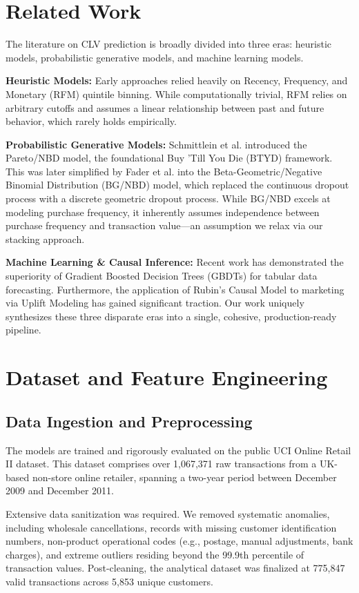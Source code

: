 \documentclass[10pt,conference]{IEEEtran}
\begin{document}
\section{Related Work}
The literature on CLV prediction is broadly divided into three eras: heuristic models, probabilistic generative models, and machine learning models.

\textbf{Heuristic Models:} Early approaches relied heavily on Recency, Frequency, and Monetary (RFM) quintile binning. While computationally trivial, RFM relies on arbitrary cutoffs and assumes a linear relationship between past and future behavior, which rarely holds empirically.

\textbf{Probabilistic Generative Models:} Schmittlein et al. introduced the Pareto/NBD model, the foundational Buy 'Till You Die (BTYD) framework. This was later simplified by Fader et al. \cite{btyd} into the Beta-Geometric/Negative Binomial Distribution (BG/NBD) model, which replaced the continuous dropout process with a discrete geometric dropout process. While BG/NBD excels at modeling purchase frequency, it inherently assumes independence between purchase frequency and transaction value—an assumption we relax via our stacking approach.

\textbf{Machine Learning \& Causal Inference:} Recent work \cite{lightgbm} has demonstrated the superiority of Gradient Boosted Decision Trees (GBDTs) for tabular data forecasting. Furthermore, the application of Rubin's Causal Model \cite{uplift} to marketing via Uplift Modeling has gained significant traction. Our work uniquely synthesizes these three disparate eras into a single, cohesive, production-ready pipeline.

\section{Dataset and Feature Engineering}

\subsection{Data Ingestion and Preprocessing}
The models are trained and rigorously evaluated on the public UCI Online Retail II dataset. This dataset comprises over 1,067,371 raw transactions from a UK-based non-store online retailer, spanning a two-year period between December 2009 and December 2011.

Extensive data sanitization was required. We removed systematic anomalies, including wholesale cancellations, records with missing customer identification numbers, non-product operational codes (e.g., postage, manual adjustments, bank charges), and extreme outliers residing beyond the 99.9th percentile of transaction values. Post-cleaning, the analytical dataset was finalized at 775,847 valid transactions across 5,853 unique customers.
\end{document}
